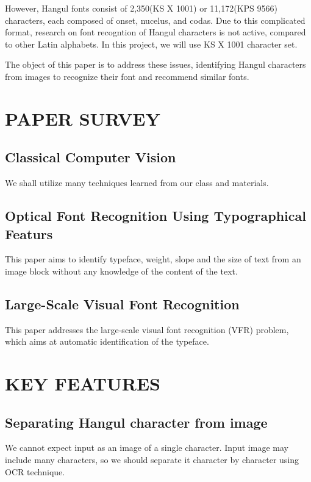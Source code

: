 \documentclass[%
 reprint,
nofootinbib,
nobibnotes,
amsmath,amssymb,
aps,
]{revtex4-1}
\begin{document}
However, Hangul fonts consist of 2,350(KS X 1001) or 11,172(KPS 9566)
characters, each composed of onset, nucelus, and codas. Due to this complicated
format, research on font recogntion of Hangul characters is not active, compared to other Latin alphabets.
In this project, we will use KS X 1001 character set.

The object of this paper is to address these issues, identifying Hangul
characters from images to recognize their font and recommend similar fonts.


\section{\label{sec:level1}PAPER SURVEY}

\subsection{\label{sec:level2}Classical Computer Vision}
We shall utilize many techniques learned from our class and materials.

\subsection{\label{sec:level2}Optical Font Recognition Using Typographical
Featurs}
This paper\cite{zramdini} aims to identify typeface, weight, slope and the size of
text from an image block without any knowledge of the content of the text.

\subsection{\label{sec:level2}Large-Scale Visual Font Recognition}
This paper\cite{chen} addresses the large-scale visual font recognition (VFR)
problem, which aims at automatic identification of the typeface.

\section{\label{sec:level2}KEY FEATURES}
\subsection{\label{sec:level3} Separating Hangul character from image}
We cannot expect input as an image of a single character.
Input image may include many characters, so we should separate it
character by character using OCR technique.
\end{document}
